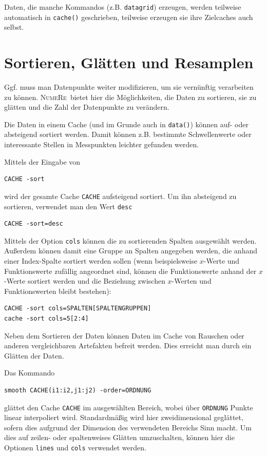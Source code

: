 \documentclass[DIV=14,headsepline,footsepline]{scrbook}
\newcommand{\NR}{\textsc{Nu\-me\-Re}}
\begin{document}
				Daten, die manche Kommandos (z.B. \verb+datagrid+) erzeugen, werden teilweise automatisch in \verb+cache()+ geschrieben, teilweise erzeugen sie ihre Zielcaches auch selbst.
			\section{Sortieren, Glätten und Resamplen}
				Ggf. muss man Datenpunkte weiter modifizieren, um sie vernünftig verarbeiten zu können. \NR\ bietet hier die Möglichkeiten, die Daten zu sortieren, sie zu glätten und die Zahl der Datenpunkte zu verändern.
				
				Die Daten in einem Cache (und im Grunde auch in \verb+data()+) können auf- oder absteigend sortiert werden. Damit können z.B. bestimmte Schwellenwerte oder interessante Stellen in Messpunkten leichter gefunden werden.
				
				Mittels der Eingabe von
				\begin{lstlisting}
CACHE -sort
				\end{lstlisting}
				wird der gesamte Cache \verb+CACHE+ aufsteigend sortiert. Um ihn absteigend zu sortieren, verwendet man den Wert \verb+desc+
				\begin{lstlisting}
CACHE -sort=desc
				\end{lstlisting}
				Mittels der Option \verb+cols+ können die zu sortierenden Spalten ausgewählt werden. Außerdem können damit eine Gruppe an Spalten angegeben werden, die anhand einer Index-Spalte sortiert werden sollen (wenn beispielsweise $x$-Werte und Funktionswerte zufällig angeordnet sind, können die Funktionswerte anhand der $x$-Werte sortiert werden und die Beziehung zwischen $x$-Werten und Funktionswerten bleibt bestehen):
				\begin{lstlisting}
CACHE -sort cols=SPALTEN[SPALTENGRUPPEN]
cache -sort cols=5[2:4]
				\end{lstlisting}
				
				Neben dem Sortieren der Daten können Daten im Cache von Rauschen oder anderen vergleichbaren Artefakten befreit werden. Dies erreicht man durch ein Glätten der Daten.
				
				Das Kommando
				\begin{lstlisting}
smooth CACHE(i1:i2,j1:j2) -order=ORDNUNG
				\end{lstlisting}
				glättet den Cache \verb+CACHE+ im ausgewählten Bereich, wobei über \verb+ORDNUNG+ Punkte linear interpoliert wird. Standardmäßig wird hier zweidimensional geglättet, sofern dies aufgrund der Dimension des verwendeten Bereichs Sinn macht. Um dies auf zeilen- oder spaltenweises Glätten umzuschalten, können hier die Optionen \verb+lines+ und \verb+cols+ verwendet werden.
				
\end{document}
